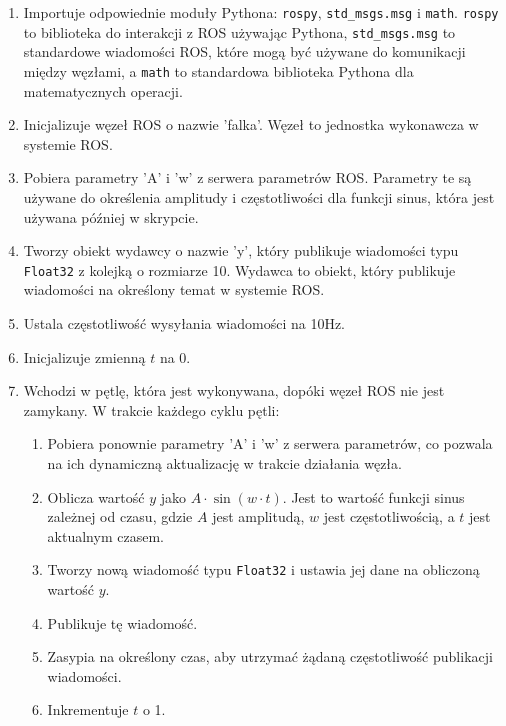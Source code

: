 \documentclass[10pt,a4paper,twoside,twocolumn]{article}%
\begin{document}
\begin{enumerate}
    \item Importuje odpowiednie moduły Pythona: \texttt{rospy}, \texttt{std\_msgs.msg} i \texttt{math}. \texttt{rospy} to biblioteka do interakcji z ROS używając Pythona, \texttt{std\_msgs.msg} to standardowe wiadomości ROS, które mogą być używane do komunikacji między węzłami, a \texttt{math} to standardowa biblioteka Pythona dla matematycznych operacji.
    
    \item Inicjalizuje węzeł ROS o nazwie 'falka'. Węzeł to jednostka wykonawcza w systemie ROS.

    \item Pobiera parametry 'A' i 'w' z serwera parametrów ROS. Parametry te są używane do określenia amplitudy i częstotliwości dla funkcji sinus, która jest używana później w skrypcie.

    \item Tworzy obiekt wydawcy o nazwie 'y', który publikuje wiadomości typu \texttt{Float32} z kolejką o rozmiarze 10. Wydawca to obiekt, który publikuje wiadomości na określony temat w systemie ROS.

    \item Ustala częstotliwość wysyłania wiadomości na 10Hz.

    \item Inicjalizuje zmienną $t$ na 0.

    \item Wchodzi w pętlę, która jest wykonywana, dopóki węzeł ROS nie jest zamykany. W trakcie każdego cyklu pętli:
    \begin{enumerate}
        \item Pobiera ponownie parametry 'A' i 'w' z serwera parametrów, co pozwala na ich dynamiczną aktualizację w trakcie działania węzła.
        
        \item Oblicza wartość $y$ jako $A \cdot \sin(w \cdot t)$. Jest to wartość funkcji sinus zależnej od czasu, gdzie $A$ jest amplitudą, $w$ jest częstotliwością, a $t$ jest aktualnym czasem.
        
        \item Tworzy nową wiadomość typu \texttt{Float32} i ustawia jej dane na obliczoną wartość $y$.
        
        \item Publikuje tę wiadomość.
        
        \item Zasypia na określony czas, aby utrzymać żądaną częstotliwość publikacji wiadomości.
        
        \item Inkrementuje $t$ o 1.
    \end{enumerate}
\end{enumerate}
\end{document}
